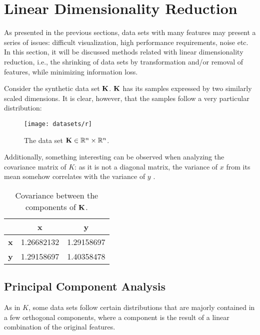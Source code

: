 \chapter{Linear Dimensionality Reduction}

As presented in the previous sections, data sets with many features may present a series of issues: difficult visualization, high performance requirements, noise etc. In this section, it will be discussed methods related with linear dimensionality reduction, i.e., the shrinking of data sets by transformation and/or removal of features, while minimizing information loss.

Consider the synthetic data set $\mathbf{K}$. $\mathbf{K}$ has its samples expressed by two similarly scaled dimensions. It is clear, however, that the samples follow a very particular distribution:

\begin{figure}[H]
    \centering
	\captionsetup{justification=centering}

	\texttt{[image: datasets/r]}
	\caption{The data set $\mathbf{K} \in \mathbb{R}^n \times \mathbb{R}^n$.}
	\label{fig:datasetr}
\end{figure}

Additionally, something interesting can be observed when analyzing the covariance matrix of $K$: as it is not a diagonal matrix, the variance of $x$ from its mean somehow correlates with the variance of $y$ \cite{pcajon2003}.

\begin{table}[H]
	\centering
	\begin{tabular}{|c|c|c|}
		\hline
			& \textbf{x} & \textbf{y} \\\hline
		\textbf{x} & 1.26682132  & 1.29158697 \\\hline
		\textbf{y} & 1.29158697  & 1.40358478 \\\hline
	\end{tabular}
	\caption{Covariance between the components of $\mathbf{K}$.}
\end{table}

\section{Principal Component Analysis}

As in $K$, some data sets follow certain distributions that are majorly contained in a few orthogonal components, where a component is the result of a linear combination of the original features.

